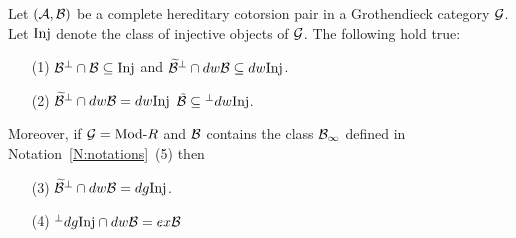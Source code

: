   \begin{lem}\label{L:Cot-inj} Let $(\mathcal{A},\mathcal{B})$ be a complete hereditary cotorsion pair in a Grothendieck category $\mathcal{G}$.
Let $\mathrm{Inj}$ denote the class of injective objects of $\mathcal{G}$. The following hold true:
\begin{enumerate}
\item[(1)] $\mathcal{B}{}^\perp{}\cap \mathcal{B}\subseteq \mathrm{Inj}$ and $\widetilde{\mathcal{B}}{}^\perp{}\cap dw \mathcal{B}\subseteq dw \mathrm{Inj}$.
\item[(2)]  $\widetilde{\mathcal{B}}{}^\perp{}\cap dw \mathcal{B}=dw \mathrm{Inj}$ \iff $\tilde{\mathcal{B}}\subseteq {}^\perp{} dw\mathrm{Inj}$.
\end{enumerate}
Moreover, if $\mathcal{G}=\mathrm{Mod}\textrm{-}{R}$ and $\mathcal{B}$ contains the class $ \mathcal{B}_{\infty}$ defined in Notation~\ref{N:notations}~(5) then
\begin{enumerate}
  \item[(3)]\label{L:Cot-inj.3} $\widetilde{\mathcal{B}}{}^\perp{}\cap dw \mathcal{B}=dg \mathrm{Inj}$.
\item[(4)]\label{L:Cot-inj.4} ${}^\perp{} dg\mathrm{Inj}\cap dw\mathcal{B}=ex \mathcal{B}$
\end{enumerate}

%
%
%
%
%

%
\end{lem}
%
